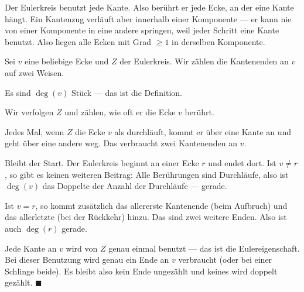 \begin{merksatz}
Der Eulerkreis benutzt jede Kante. Also berührt er jede Ecke, an der eine Kante hängt. Ein Kantenzug verläuft aber innerhalb einer Komponente --- er kann nie von einer Komponente in eine andere springen, weil jeder Schritt eine Kante benutzt. Also liegen alle Ecken mit Grad $\ge 1$ in derselben Komponente.

Sei $v$ eine beliebige Ecke und $Z$ der Eulerkreis. Wir zählen die Kantenenden an $v$ auf zwei Weisen.

 Es sind $\deg(v)$ Stück --- das ist die Definition.

 Wir verfolgen $Z$ und zählen, wie oft er die Ecke $v$ berührt.

Jedes Mal, wenn $Z$ die Ecke $v$ als  durchläuft, kommt er über eine Kante an und geht über eine andere weg. Das verbraucht zwei Kantenenden an $v$.

Bleibt der Start. Der Eulerkreis beginnt an einer Ecke $r$ und endet dort. Ist $v \neq r$, so gibt es keinen weiteren Beitrag: Alle Berührungen sind Durchläufe, also ist $\deg(v)$ das Doppelte der Anzahl der Durchläufe --- gerade.

Ist $v = r$, so kommt zusätzlich das allererste Kantenende (beim Aufbruch) und das allerletzte (bei der Rückkehr) hinzu. Das sind zwei weitere Enden. Also ist auch $\deg(r)$ gerade.

Jede Kante an $v$ wird von $Z$ genau einmal benutzt --- das ist die Eulereigenschaft. Bei dieser Benutzung wird genau ein Ende an $v$ verbraucht (oder bei einer Schlinge beide). Es bleibt also kein Ende ungezählt und keines wird doppelt gezählt. $\blacksquare$

\begin{center}
\end{center}
\end{merksatz}

